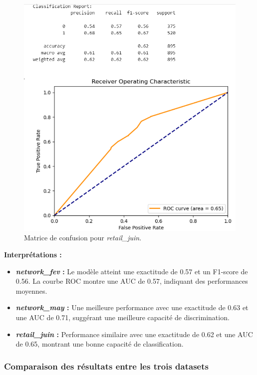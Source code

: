 \begin{figure}[H]
    \centering
    \begin{minipage}{0.45\textwidth}
        \centering
        \includegraphics[width=\linewidth]{capture_modele_8.png}
        \caption{Matrice de confusion pour \textit{retail\_juin}.}
    \end{minipage}
\end{figure}

\textbf{Interprétations :}
\begin{itemize}
    \item \textbf{\textit{network\_fev} :} Le modèle atteint une exactitude de 0.57 et un F1-score de 0.56. La courbe ROC montre une AUC de 0.57, indiquant des performances moyennes.
    \item \textbf{\textit{network\_may} :} Une meilleure performance avec une exactitude de 0.63 et une AUC de 0.71, suggérant une meilleure capacité de discrimination.
    \item \textbf{\textit{retail\_juin} :} Performance similaire avec une exactitude de 0.62 et une AUC de 0.65, montrant une bonne capacité de classification.
\end{itemize}

\subsubsection{Comparaison des résultats entre les trois datasets}


